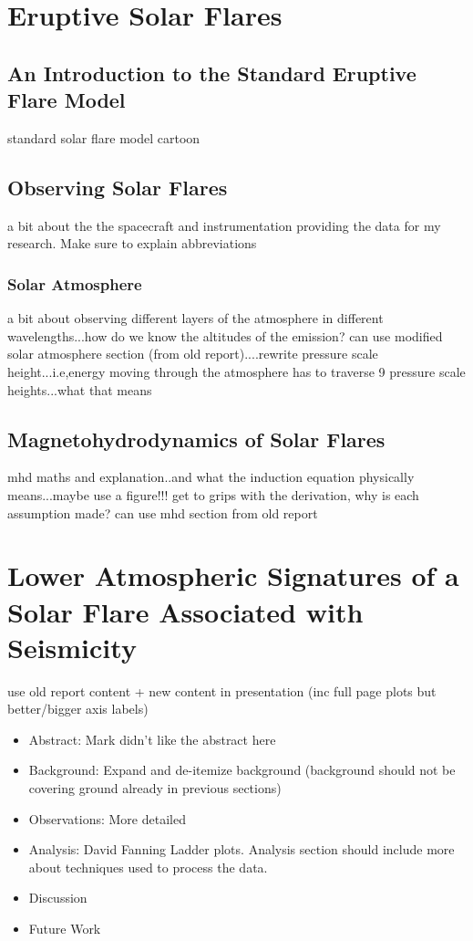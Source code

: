 \documentclass[10pt]{article}
\begin{document}
\section{Eruptive Solar Flares}
\subsection{An Introduction to the Standard Eruptive Flare Model} 
standard solar flare model
cartoon
\subsection{Observing Solar Flares}
a bit about the the spacecraft and instrumentation providing the data for my research. Make sure to explain abbreviations
\subsubsection{Solar Atmosphere}
a bit about observing different layers of the atmosphere in different wavelengths...how do we know the altitudes of the emission?
can use modified solar atmosphere section (from old report)....rewrite pressure scale height...i.e,energy moving through the atmosphere has to traverse 9 pressure scale heights...what that means
\subsection{Magnetohydrodynamics of Solar Flares}
mhd maths and explanation..and what the induction equation physically means...maybe use a figure!!!
get to grips with the derivation, why is each assumption made?
can use mhd section from old report

\section{Lower Atmospheric Signatures of a Solar Flare Associated with Seismicity}
use old report content + new content in presentation (inc full page plots but better/bigger axis labels)
\begin{itemize}
\item Abstract: Mark didn't like the abstract here
\item Background: Expand and de-itemize background (background should not be covering ground already in previous sections)
\item Observations: More detailed
\item Analysis: David Fanning Ladder plots. Analysis section should include more about techniques used to process the data.
\item Discussion
\item Future Work
\end{itemize}
\end{document}
